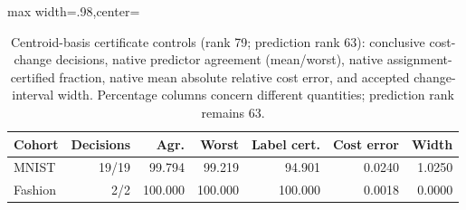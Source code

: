 \begin{table}[tbp]
\centering
\caption{Centroid-basis certificate controls (rank 79; prediction rank 63): conclusive cost-change decisions, native predictor agreement (mean/worst), native assignment-certified fraction, native mean absolute relative cost error, and accepted change-interval width. Percentage columns concern different quantities; prediction rank remains 63.}
\label{tab:completed-quality}
\begin{adjustbox}{max width=.98\textwidth,center=\textwidth}
\begin{tabular}{lrrrrrr}
\toprule
Cohort & Decisions & Agr. & Worst & Label cert. & Cost error & Width\\
\midrule
MNIST & 19/19 & 99.794 & 99.219 & 94.901 & 0.0240 & 1.0250\\
Fashion & 2/2 & 100.000 & 100.000 & 100.000 & 0.0018 & 0.0000\\
\bottomrule
\end{tabular}
\end{adjustbox}
\end{table}
